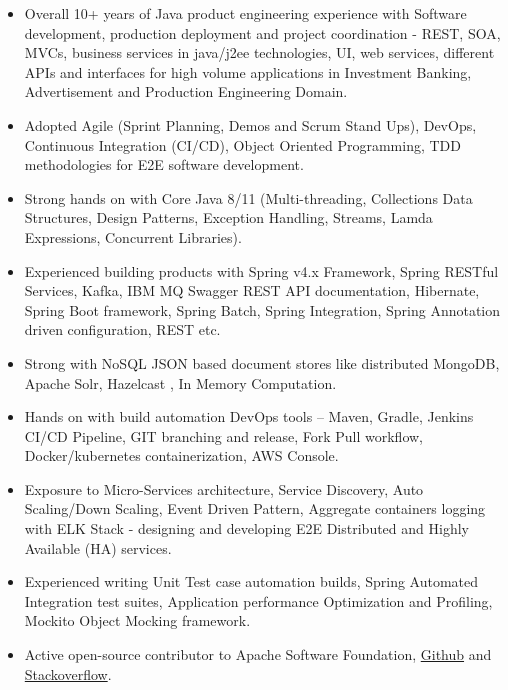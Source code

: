 \documentclass[10pt,A4]{article}
\begin{document}
\begin{itemize}
\item Overall 10+ years of Java product engineering experience with Software development, 
production deployment and project coordination - REST, SOA,
MVCs, business services in java/j2ee technologies, UI, web services, different APIs and
interfaces for high volume applications in Investment Banking, Advertisement and Production Engineering Domain.

\item Adopted Agile (Sprint Planning, Demos and Scrum Stand Ups), DevOps, Continuous Integration (CI/CD),
Object Oriented Programming, TDD methodologies for E2E software development.

\item Strong hands on with Core Java 8/11 (Multi-threading, Collections Data Structures, Design Patterns,
Exception Handling, Streams, Lamda Expressions, Concurrent Libraries).

\item Experienced building products with Spring v4.x Framework, Spring RESTful Services, Kafka, IBM MQ
Swagger REST API documentation, Hibernate, Spring Boot framework, Spring Batch, Spring Integration, 
Spring Annotation driven configuration, REST etc.

\item Strong with NoSQL JSON based document stores like distributed MongoDB, Apache Solr, Hazelcast , In Memory Computation.

\item Hands on with build automation DevOps tools – Maven, Gradle, Jenkins CI/CD Pipeline, GIT branching
and release, Fork Pull workflow, Docker/kubernetes containerization, AWS Console.

\item Exposure to Micro-Services architecture, Service Discovery, Auto Scaling/Down Scaling, Event Driven
Pattern, Aggregate containers logging with ELK Stack - designing and developing E2E Distributed and
Highly Available (HA) services.

\item Experienced writing Unit Test case automation builds, Spring Automated Integration test suites,
Application performance Optimization and Profiling, Mockito Object Mocking framework.

\item Active open-source contributor to Apache Software Foundation, \href{http://github.com/ameyjadiye/}{Github} and \href{https://stackoverflow.com/users/2664649/amey-jadiye}{Stackoverflow}.
\end{itemize} 
\end{document}
